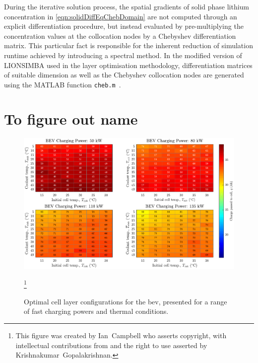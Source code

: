 During the iterative solution process, the spatial gradients of solid phase
lithium concentration in \cref{eqn:solidDiffEqChebDomain} are not computed
through an explicit differentiation procedure, but instead evaluated by
pre-multiplying the concentration values at the collocation nodes by a
Chebyshev differentiation matrix. This particular fact is responsible for
the inherent reduction of simulation runtime achieved by introducing a
spectral method. In the modified version of LIONSIMBA used in the layer
optimisation methodology, differentiation matrices of suitable dimension as well
as the Chebyshev collocation nodes are generated using the MATLAB function
\texttt{cheb.m}~\cite{Trefethen2000}.







\section{To figure out name}\label{sec:Configurations}



\begin{figure}[!bp]
    \begin{minipage}[t]{\textwidth}
        \centering
        \includegraphics[width=\textwidth]{fig_generate_heatmap_BEV}
        \caption[Optimal cell layer configurations for the \gls{bev}, presented for a range of fast charging powers and thermal conditions]{Optimal cell layer configurations for the \gls{bev}, presented for a range of fast charging powers and thermal conditions\footnotemark.}
        \label{fig:fig_generate_heatmap_BEV}
        \mpfootnotes[1]
        \footnote{This figure was created by \mbox{Ian Campbell} who asserts copyright,
            with intellectual contributions from and the right to use asserted by
        \mbox{Krishnakumar Gopalakrishnan}.}
    \end{minipage}
\end{figure}

